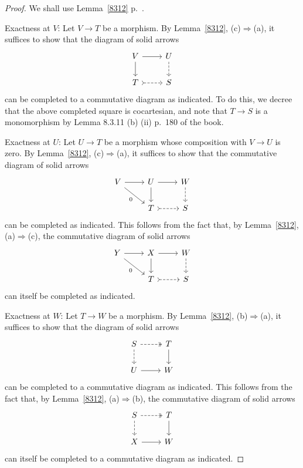 \documentclass[12pt]{article}%
\theoremstyle{remark}
\theoremstyle{definition}
\newcommand{\nn}{\noindent}
\newcommand{\then}{\Rightarrow}
\begin{document}
\begin{proof}
We shall use Lemma~\ref{8312} p.~\pageref{8312}.

\nn Exactness at $V$: Let $V\to T$ be a morphism. By Lemma~\ref{8312}, (c)$\then$(a), it suffices to show that the diagram of solid arrows 
$$
\begin{tikzcd}
V\ar{r}\ar{d}&U\ar[dashed]{d}\\ 
T\ar[dashed,tail]{r}&S
\end{tikzcd}
$$ 
can be completed to a commutative diagram as indicated. To do this, we decree that the above completed square is cocartesian, and note that $T\to S$ is a monomorphism by Lemma 8.3.11 (b) (ii) p.~180 of the book.

\nn Exactness at $U$: Let $U\to T$ be a morphism whose composition with $V\to U$ is zero. By Lemma~\ref{8312}, (c)$\then$(a), it suffices to show that the commutative diagram of solid arrows 
$$
\begin{tikzcd}
V\ar{r}\ar{dr}[swap]{0}&U\ar{r}\ar{d}&W\ar[dashed]{d}\\ 
{}&T\ar[dashed,tail]{r}&S
\end{tikzcd}
$$ 
can be completed as indicated. This follows from the fact that, by Lemma~\ref{8312}, (a)$\then$(c), the commutative diagram of solid arrows 
$$
\begin{tikzcd}
Y\ar{r}\ar{dr}[swap]{0}&X\ar{r}\ar{d}&W\ar[dashed]{d}\\ 
{}&T\ar[dashed,tail]{r}&S
\end{tikzcd}
$$ 
can itself be completed as indicated.

\nn Exactness at $W$: Let $T\to W$ be a morphism. By Lemma~\ref{8312}, (b)$\then$(a), it suffices to show that the diagram of solid arrows 
$$
\begin{tikzcd}
S\ar[dashed,two heads]{r}\ar[dashed]{d}&T\ar{d}\\ 
U\ar{r}&W
\end{tikzcd}
$$ 
can be completed to a commutative diagram as indicated. This follows from the fact that, by Lemma~\ref{8312}, (a)$\then$(b), the commutative diagram of solid arrows 
$$
\begin{tikzcd}
S\ar[dashed,two heads]{r}\ar[dashed]{d}&T\ar{d}\\ 
X\ar{r}&W
\end{tikzcd}
$$ 
can itself be completed to a commutative diagram as indicated.
\end{proof}
\end{document}

